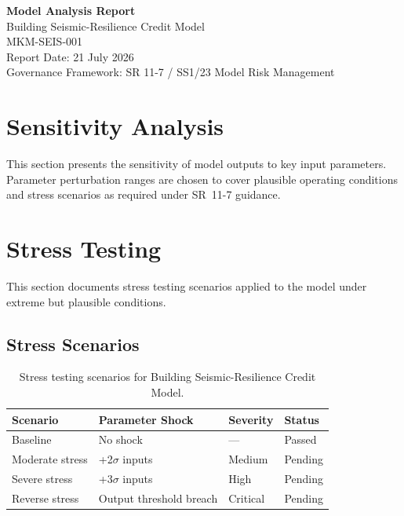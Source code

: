 \documentclass[11pt,a4paper]{article}
\begin{document}
\begin{center}
{\Large\textbf{Model Analysis Report}}\\[6pt]
{\large\textcolor{mkmblue}{Building Seismic-Resilience Credit Model}}\\[4pt]
{\normalsize MKM-SEIS-001}\\[12pt]
{\small Report Date: 21 July 2026}\\[4pt]
{\footnotesize Governance Framework: SR 11-7 / SS1/23 Model Risk Management}
\end{center}

\vspace{8mm}
\tableofcontents
\newpage

\section{Sensitivity Analysis}

This section presents the sensitivity of model outputs to key input parameters.
Parameter perturbation ranges are chosen to cover plausible operating conditions
and stress scenarios as required under SR~11-7 guidance.




\section{Stress Testing}

This section documents stress testing scenarios applied to the model
under extreme but plausible conditions.

\subsection{Stress Scenarios}

\begin{table}[H]
    \centering
    \caption{Stress testing scenarios for Building Seismic-Resilience Credit Model.}
    \begin{tabular}{llll}
        \toprule
        \textbf{Scenario} & \textbf{Parameter Shock} & \textbf{Severity} & \textbf{Status} \\
        \midrule
        Baseline & No shock & --- & Passed \\
        Moderate stress & +2$\sigma$ inputs & Medium & Pending \\
        Severe stress & +3$\sigma$ inputs & High & Pending \\
        Reverse stress & Output threshold breach & Critical & Pending \\
        \bottomrule
    \end{tabular}
\end{table}
\end{document}
